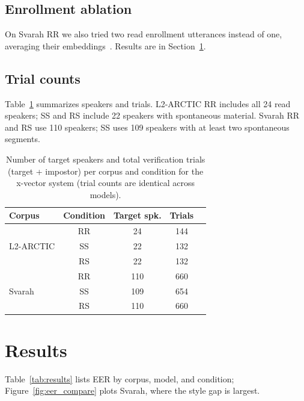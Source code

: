 \documentclass[cameraready]{Interspeech}
\begin{document}
\subsection{Enrollment ablation}

On Svarah RR we also tried two read enrollment utterances instead of one, averaging their embeddings~\cite{snyder2018xvector}. Results are in Section~\ref{sec:results}.

\subsection{Trial counts}

Table~\ref{tab:trialcounts} summarizes speakers and trials. L2-ARCTIC RR includes all 24 read speakers; SS and RS include 22 speakers with spontaneous material. Svarah RR and RS use 110 speakers; SS uses 109 speakers with at least two spontaneous segments.

\begin{table}[H]
  \caption{Number of target speakers and total verification trials (target + impostor) per corpus and condition for the x-vector system (trial counts are identical across models).}
  \label{tab:trialcounts}
  \centering
  \begin{tabular}{lcccc}
    \toprule
    Corpus & Condition & Target spk. & Trials \\
    \midrule
    \multirow{3}{*}{L2-ARCTIC} & RR & 24 & 144 \\
     & SS & 22 & 132 \\
     & RS & 22 & 132 \\
    \midrule
    \multirow{3}{*}{Svarah} & RR & 110 & 660 \\
     & SS & 109 & 654 \\
     & RS & 110 & 660 \\
    \bottomrule
  \end{tabular}
\end{table}

\section{Results}
\label{sec:results}

Table~\ref{tab:results} lists EER by corpus, model, and condition; Figure~\ref{fig:eer_compare} plots Svarah, where the style gap is largest.
\end{document}
